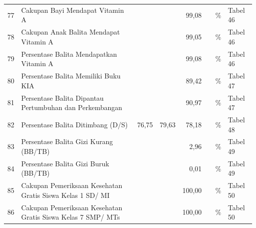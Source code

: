 \begin{small}
\begin{longtable}{rY{12em}rrrrY{5em}Y{5em}}
	 77 & Cakupan Bayi Mendapat Vitamin A                                                                         &        &        &   99,08 &                    & \%                             & Tabel 46 \\
	                   78 & Cakupan Anak Balita Mendapat Vitamin A                                                                  &        &        &   99,05 &                    & \%                             & Tabel 46 \\
	 79 & Persentase Balita Mendapatkan Vitamin A                                                                 &        &        &   99,08 &                    & \%                             & Tabel 46 \\
	                   80 & Persentase Balita Memiliki Buku KIA                                                                     &        &        &   89,42 &                    & \%                             & Tabel 47 \\
	 81 & Persentase Balita Dipantau Pertumbuhan dan Perkembangan                                                 &        &        &   90,97 &                    & \%                             & Tabel 47 \\
	                   82 & Persentase Balita Ditimbang (D/S)                                                                       &  76,75 &  79,63 &   78,18 &                    & \%                             & Tabel 48 \\
	 83 & Persentase Balita Gizi Kurang (BB/TB)                                                                   &        &        &    2,96 &                    & \%                             & Tabel 49 \\
	                   84 & Persentase Balita Gizi Buruk (BB/TB)                                                                    &        &        &    0,01 &                    & \%                             & Tabel 49 \\
	 85 & Cakupan Pemeriksaan Kesehatan Gratis Siswa Kelas 1 SD/ MI                                               &        &        &  100,00 &                    & \%                             & Tabel 50 \\
	                   86 & Cakupan Pemeriksaan Kesehatan Gratis Siswa Kelas 7 SMP/ MTs                                             &        &        &  100,00 &                    & \%                             & Tabel 50 \\

\end{longtable}
\end{small}
